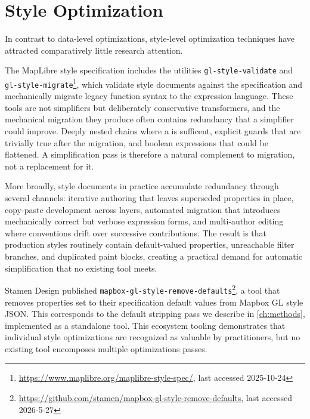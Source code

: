 \section{Style Optimization}\label{sec:rw_style_optimizations}

In contrast to data-level optimizations, style-level optimization techniques have attracted comparatively little research attention.

\begin{sloppypar}
The MapLibre style specification includes the utilities \texttt{gl\allowbreak-style\allowbreak-validate} and \texttt{gl\allowbreak-style\allowbreak-migrate}\footnote{\url{https://www.maplibre.org/maplibre-style-spec/}, last accessed 2025-10-24}, which validate style documents against the specification and mechanically migrate legacy function syntax to the expression language.
These tools are not simplifiers but deliberately conservative transformers, and the mechanical migration they produce often contains redundancy that a simplifier could improve.
Deeply nested  chains where a  is sufficent, explicit  guards that are trivially true after the migration, and boolean expressions that could be flattened.
A simplification pass is therefore a natural complement to migration, not a replacement for it.
\end{sloppypar}

More broadly, style documents in practice accumulate redundancy through several channels: iterative authoring that leaves superseded properties in place, copy-paste development across layers, automated migration that introduces mechanically correct but verbose expression forms, and multi-author editing where conventions drift over successive contributions.
The result is that production styles routinely contain default-valued properties, unreachable filter branches, and duplicated paint blocks, creating a practical demand for automatic simplification that no existing tool meets.

Stamen Design published \texttt{mapbox-gl-style-remove-defaults}\footnote{\url{https://github.com/stamen/mapbox-gl-style-remove-defaults}, last accessed 2026-5-27}, a tool that removes properties set to their specification default values from Mapbox GL style \ac{JSON}.
This corresponds to the default stripping pass we describe in \cref{ch:methods}, implemented as a standalone tool.
This ecosystem tooling demonstrates that individual style optimizations are recognized as valuable by practitioners, but no existing tool encomposes multiple optimizations passes.

